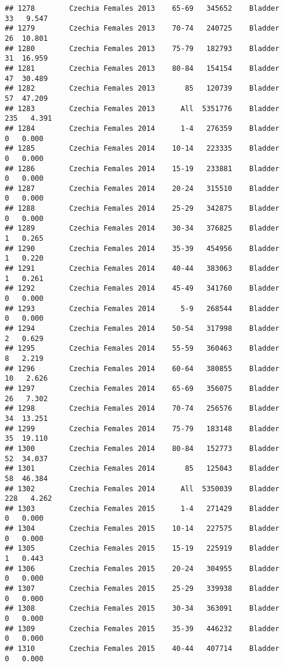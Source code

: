 \documentclass[
]{article}
\begin{document}
\begin{verbatim}
## 1278        Czechia Females 2013    65-69   345652    Bladder     33   9.547
## 1279        Czechia Females 2013    70-74   240725    Bladder     26  10.801
## 1280        Czechia Females 2013    75-79   182793    Bladder     31  16.959
## 1281        Czechia Females 2013    80-84   154154    Bladder     47  30.489
## 1282        Czechia Females 2013       85   120739    Bladder     57  47.209
## 1283        Czechia Females 2013      All  5351776    Bladder    235   4.391
## 1284        Czechia Females 2014      1-4   276359    Bladder      0   0.000
## 1285        Czechia Females 2014    10-14   223335    Bladder      0   0.000
## 1286        Czechia Females 2014    15-19   233881    Bladder      0   0.000
## 1287        Czechia Females 2014    20-24   315510    Bladder      0   0.000
## 1288        Czechia Females 2014    25-29   342875    Bladder      0   0.000
## 1289        Czechia Females 2014    30-34   376825    Bladder      1   0.265
## 1290        Czechia Females 2014    35-39   454956    Bladder      1   0.220
## 1291        Czechia Females 2014    40-44   383063    Bladder      1   0.261
## 1292        Czechia Females 2014    45-49   341760    Bladder      0   0.000
## 1293        Czechia Females 2014      5-9   268544    Bladder      0   0.000
## 1294        Czechia Females 2014    50-54   317998    Bladder      2   0.629
## 1295        Czechia Females 2014    55-59   360463    Bladder      8   2.219
## 1296        Czechia Females 2014    60-64   380855    Bladder     10   2.626
## 1297        Czechia Females 2014    65-69   356075    Bladder     26   7.302
## 1298        Czechia Females 2014    70-74   256576    Bladder     34  13.251
## 1299        Czechia Females 2014    75-79   183148    Bladder     35  19.110
## 1300        Czechia Females 2014    80-84   152773    Bladder     52  34.037
## 1301        Czechia Females 2014       85   125043    Bladder     58  46.384
## 1302        Czechia Females 2014      All  5350039    Bladder    228   4.262
## 1303        Czechia Females 2015      1-4   271429    Bladder      0   0.000
## 1304        Czechia Females 2015    10-14   227575    Bladder      0   0.000
## 1305        Czechia Females 2015    15-19   225919    Bladder      1   0.443
## 1306        Czechia Females 2015    20-24   304955    Bladder      0   0.000
## 1307        Czechia Females 2015    25-29   339938    Bladder      0   0.000
## 1308        Czechia Females 2015    30-34   363091    Bladder      0   0.000
## 1309        Czechia Females 2015    35-39   446232    Bladder      0   0.000
## 1310        Czechia Females 2015    40-44   407714    Bladder      0   0.000

\end{verbatim}
\end{document}
